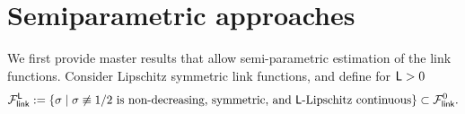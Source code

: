 \section{Semiparametric approaches}
\label{sec:semi-supp}
We first provide master results that
allow semi-parametric estimation of the link functions.  Consider
Lipschitz symmetric link functions, and define for $\mathsf{L} > 0$
\begin{align*}
	\mathcal{F}_{\mathsf{link}}^{\mathsf{L}} := \{\sigma \mid \sigma \not \equiv 1/2\text{ is non-decreasing,
		symmetric, and} ~ \mathsf{L}\text{-Lipschitz continuous} \}
	\subset \mathcal{F}_{\mathsf{link}}^0.
\end{align*}

